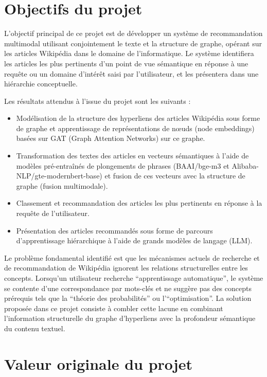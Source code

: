 \section{Objectifs du projet}

L'objectif principal de ce projet est de développer un système de recommandation multimodal utilisant conjointement le texte et la structure de graphe, opérant sur les articles Wikipédia dans le domaine de l'informatique. Le système identifiera les articles les plus pertinents d'un point de vue sémantique en réponse à une requête ou un domaine d'intérêt saisi par l'utilisateur, et les présentera dans une hiérarchie conceptuelle.

Les résultats attendus à l'issue du projet sont les suivants :

\begin{itemize}
    \item Modélisation de la structure des hyperliens des articles Wikipédia sous forme de graphe et apprentissage de représentations de n\oe uds (node embeddings) basées sur GAT (Graph Attention Networks) sur ce graphe.
    \item Transformation des textes des articles en vecteurs sémantiques à l'aide de modèles pré-entraînés de plongements de phrases (BAAI/bge-m3 et Alibaba-NLP/gte-modernbert-base) et fusion de ces vecteurs avec la structure de graphe (fusion multimodale).
    \item Classement et recommandation des articles les plus pertinents en réponse à la requête de l'utilisateur.
    \item Présentation des articles recommandés sous forme de parcours d'apprentissage hiérarchique à l'aide de grands modèles de langage (LLM).
\end{itemize}

Le problème fondamental identifié est que les mécanismes actuels de recherche et de recommandation de Wikipédia ignorent les relations structurelles entre les concepts. Lorsqu'un utilisateur recherche ``apprentissage automatique'', le système se contente d'une correspondance par mots-clés et ne suggère pas des concepts prérequis tels que la ``théorie des probabilités'' ou l'``optimisation''. La solution proposée dans ce projet consiste à combler cette lacune en combinant l'information structurelle du graphe d'hyperliens avec la profondeur sémantique du contenu textuel.

\section{Valeur originale du projet}

